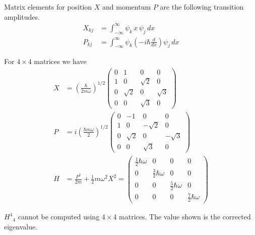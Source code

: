 \documentclass[12pt]{article}
\begin{document}
\noindent
Matrix elements for position $X$ and momentum $P$ are the following transition amplitudes.
\begin{align*}
X_{kj}&=\int_{-\infty}^\infty \psi_k\,x\,\psi_j\,dx
\\[1ex]
P_{kj}&=\int_{-\infty}^\infty \psi_k\left(-i\hbar\frac{d}{dx}\right)\psi_j\,dx
\end{align*}

\noindent
For $4\times4$ matrices we have
\begin{align*}
X&=\left(\frac{\hbar}{2m\omega}\right)^{1/2}
\begin{pmatrix}
0 & 1 & 0 & 0
\\
1 & 0 & \sqrt{2} & 0
\\
0 & \sqrt{2} & 0 & \sqrt{3}
\\
0 & 0 & \sqrt{3} & 0
\end{pmatrix}
\\[1ex]
P&=i\left(\frac{\hbar m\omega}{2}\right)^{1/2}
\begin{pmatrix}
0 & -1 & 0 & 0
\\
1 & 0 & -\sqrt{2} & 0
\\
0 & \sqrt{2} & 0 & -\sqrt{3}
\\
0 & 0 & \sqrt{3} & 0
\end{pmatrix}
\\[1ex]
H&=\frac{P^2}{2m}+\frac{1}{2}m\omega^2 X^2
=\begin{pmatrix}
\tfrac{1}{2}\hbar\omega & 0 & 0 & 0
\\
0 & \tfrac{3}{2}\hbar\omega & 0 & 0
\\
0 & 0 & \tfrac{5}{2}\hbar\omega & 0
\\
0 & 0 & 0 & \tfrac{7}{2}\hbar\omega
\end{pmatrix}
\end{align*}

\noindent
$H^4{}_4$ cannot be computed using $4\times4$ matrices.
The value shown is the corrected eigenvalue.
\end{document}

